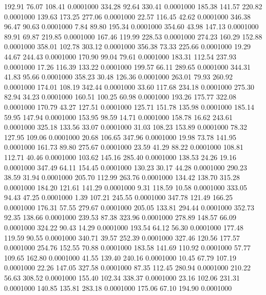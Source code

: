  192.91   76.07  108.41   0.0001000
 334.28   92.64  330.41   0.0001000
 185.38  141.57  220.82   0.0001000
 139.63  173.25  277.06   0.0001000
  22.57  116.45   42.62   0.0001000
 346.38   96.47   90.63   0.0001000
   7.84   89.80  195.34   0.0001000
 354.60   43.98  147.13   0.0001000
  89.91   69.87  219.85   0.0001000
 167.46  119.99  228.53   0.0001000
 274.23  160.29  152.88   0.0001000
 358.01  102.78  303.12   0.0001000
 356.38   73.33  225.66   0.0001000
  19.29   44.67  244.43   0.0001000
 170.90   99.04   79.61   0.0001000
 183.31  112.54  237.93   0.0001000
  17.26  116.39  133.22   0.0001000
 199.57   66.11  289.65   0.0001000
 344.31   41.83   95.66   0.0001000
 358.23   30.48  126.36   0.0001000
 263.01   79.93  260.92   0.0001000
 174.01  108.19  342.44   0.0001000
  33.60  117.68  234.18   0.0001000
 275.30   82.94   34.23   0.0001000
 160.51  100.25   60.98   0.0001000
 193.26  175.77  322.08   0.0001000
 170.79   43.27  127.51   0.0001000
 125.71  151.78  135.98   0.0001000
 185.14   59.95  147.94   0.0001000
 153.95   98.59   14.71   0.0001000
 158.78   16.62  243.61   0.0001000
 325.18  133.56   33.07   0.0001000
  31.03  108.23  153.89   0.0001000
  78.32  127.95  109.06   0.0001000
  20.68  106.65  347.96   0.0001000
  19.98   73.78  141.95   0.0001000
 161.73   89.80  275.67   0.0001000
  23.59   41.29   88.22   0.0001000
 108.81  112.71   40.46   0.0001000
 103.62  145.16  285.40   0.0001000
 138.53   24.26   19.16   0.0001000
 347.49   64.11  154.45   0.0001000
 130.23   30.17   44.28   0.0001000
 290.23   38.59   31.94   0.0001000
 205.70  112.99  263.76   0.0001000
 134.42  138.70  315.28   0.0001000
 184.20  121.61  141.29   0.0001000
   9.31  118.59   10.58   0.0001000
 333.05   94.43   47.25   0.0001000
   1.39  107.21  245.55   0.0001000
 347.78  121.49  166.25   0.0001000
 176.31   57.55  279.67   0.0001000
 205.05  133.81  294.44   0.0001000
 352.73   92.35  138.66   0.0001000
 239.53   87.38  323.96   0.0001000
 278.89  148.57   66.09   0.0001000
 324.22   90.43   14.29   0.0001000
 193.54   64.12   56.30   0.0001000
 177.48  119.59   90.55   0.0001000
 340.71   39.57  252.39   0.0001000
 327.46  120.56  177.57   0.0001000
 254.76  152.55   70.88   0.0001000
 183.58  141.69  110.92   0.0001000
  57.77  109.65  162.80   0.0001000
  41.55  139.40  240.16   0.0001000
  10.45   67.79  107.19   0.0001000
  22.26  147.05  327.58   0.0001000
  87.35  112.45  280.94   0.0001000
 210.22   56.63  308.52   0.0001000
 155.40  102.34  338.37   0.0001000
  23.16  102.06  231.31   0.0001000
 140.85  135.81  283.18   0.0001000
 175.06   67.10  194.90   0.0001000

